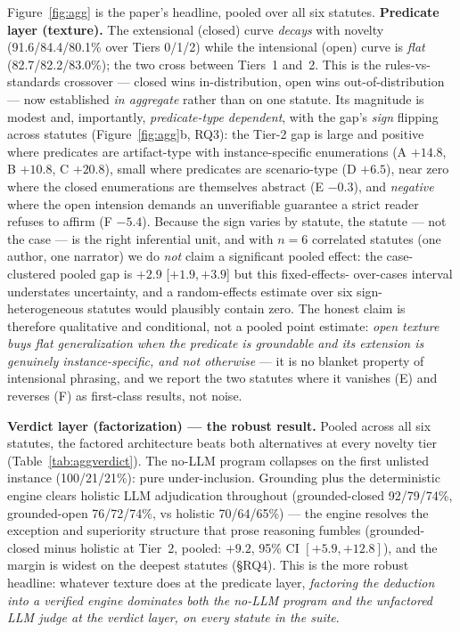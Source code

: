 Figure~\ref{fig:agg} is the paper's headline, pooled over all six statutes.
\textbf{Predicate layer (texture).} The extensional (closed) curve \emph{decays}
with novelty (91.6/84.4/80.1\% over Tiers 0/1/2) while the intensional (open)
curve is \emph{flat} (82.7/82.2/83.0\%); the two cross between Tiers~1 and~2.
This is the \citet{kaplow1992rules} rules-vs-standards crossover --- closed
wins in-distribution, open wins out-of-distribution --- now established
\emph{in aggregate} rather than on one statute. Its magnitude is modest and, importantly,
\emph{predicate-type dependent}, with the gap's \emph{sign} flipping across
statutes (Figure~\ref{fig:agg}b, RQ3): the Tier-2 gap is large and positive
where predicates are artifact-type with instance-specific enumerations
(A $+14.8$, B $+10.8$, C $+20.8$), small where predicates are scenario-type
(D $+6.5$), near zero where the closed enumerations are themselves abstract
(E $-0.3$), and \emph{negative} where the open intension demands an
unverifiable guarantee a strict reader refuses to affirm (F $-5.4$). Because
the sign varies by statute, the statute --- not the case --- is the right
inferential unit, and with $n{=}6$ correlated statutes (one author, one
narrator) we do \emph{not} claim a significant pooled effect: the
case-clustered pooled gap is $+2.9$ [$+1.9, +3.9$] but this fixed-effects-%
over-cases interval understates uncertainty, and a random-effects estimate
over six sign-heterogeneous statutes would plausibly contain zero. The honest
claim is therefore qualitative and conditional, not a pooled point estimate:
\emph{open texture buys flat generalization when the predicate is groundable
and its extension is genuinely instance-specific, and not otherwise} --- it is
no blanket property of intensional phrasing, and we report the two statutes
where it vanishes (E) and reverses (F) as first-class results, not noise.

\textbf{Verdict layer (factorization) --- the robust result.}
Pooled across all six statutes, the factored architecture beats both
alternatives at every novelty tier (Table~\ref{tab:aggverdict}). The no-LLM
program collapses on the first unlisted instance (100/21/21\%): pure
under-inclusion. Grounding plus the deterministic engine clears holistic LLM
adjudication throughout (grounded-closed 92/79/74\%, grounded-open
76/72/74\%, vs holistic 70/64/65\%) --- the engine resolves the exception and
superiority structure that prose reasoning fumbles (grounded-closed minus
holistic at Tier~2, pooled: $+9.2$, 95\% CI $[+5.9, +12.8]$), and the margin
is widest on the deepest statutes (\S RQ4). This is the more robust headline: whatever
texture does at the predicate layer, \emph{factoring the deduction into a
verified engine dominates both the no-LLM program and the unfactored LLM
judge at the verdict layer, on every statute in the suite}.

